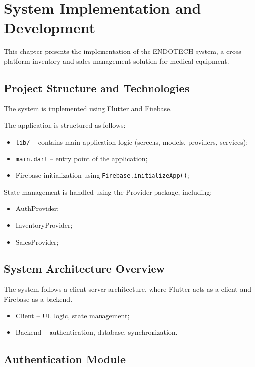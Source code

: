 \chapter{System Implementation and Development}

This chapter presents the implementation of the ENDOTECH system, a cross-platform inventory and sales management solution for medical equipment.

\section{Project Structure and Technologies}

The system is implemented using Flutter and Firebase.

The application is structured as follows:

\begin{itemize}
    \item \texttt{lib/} – contains main application logic (screens, models, providers, services);
    \item \texttt{main.dart} – entry point of the application;
    \item Firebase initialization using \texttt{Firebase.initializeApp()};
\end{itemize}

State management is handled using the Provider package, including:

\begin{itemize}
    \item AuthProvider;
    \item InventoryProvider;
    \item SalesProvider;
\end{itemize}

\section{System Architecture Overview}

The system follows a client-server architecture, where Flutter acts as a client and Firebase as a backend.

\begin{itemize}
    \item Client – UI, logic, state management;
    \item Backend – authentication, database, synchronization.
\end{itemize}

\section{Authentication Module}

